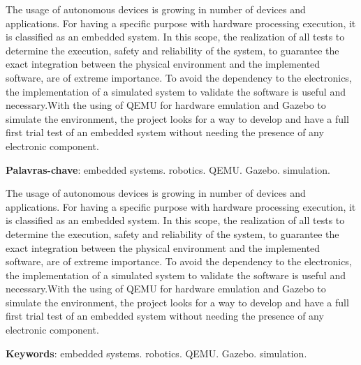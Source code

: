 \documentclass[../monografia.tex]{subfiles}
\begin{document}
    \clearpage

    {\centering   
    }
     The usage of autonomous devices is growing in number of devices and applications. For having a specific purpose with hardware processing execution, it is classified as an embedded system. In this scope, the realization of all tests to determine the execution, safety and reliability of the system, to guarantee the exact integration between the physical environment  and the implemented software, are of extreme importance. To avoid the dependency to the electronics, the implementation of a simulated system to validate the software is useful and necessary.With the using of QEMU for hardware emulation and Gazebo to simulate the environment, the project looks for a way to develop and have a full first trial test of an embedded system without needing the presence of any electronic component.
    
     \textbf{Palavras-chave}: embedded systems. robotics. QEMU. Gazebo. simulation.
        
    \clearpage
    
    {\centering   
    }
    \hspace{1cm} The usage of autonomous devices is growing in number of devices and applications. For having a specific purpose with hardware processing execution, it is classified as an embedded system. In this scope, the realization of all tests to determine the execution, safety and reliability of the system, to guarantee the exact integration between the physical environment  and the implemented software, are of extreme importance. To avoid the dependency to the electronics, the implementation of a simulated system to validate the software is useful and necessary.With the using of QEMU for hardware emulation and Gazebo to simulate the environment, the project looks for a way to develop and have a full first trial test of an embedded system without needing the presence of any electronic component.

   \vspace{\onelineskip}
 
   \noindent 
   \textbf{Keywords}: embedded systems. robotics. QEMU. Gazebo. simulation.
\end{document}
